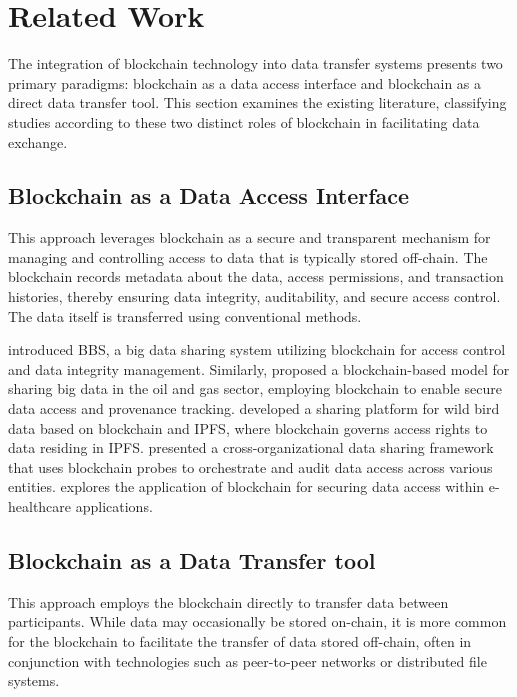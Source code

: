 \documentclass[10pt]{llncs}
\begin{document}
\section{Related Work} \label{related_work}

The integration of blockchain technology into data transfer systems presents two primary paradigms: blockchain as a data access interface and blockchain as a direct data transfer tool. 
This section examines the existing literature, classifying studies according to these two distinct roles of blockchain in facilitating data exchange.

\subsection{Blockchain as a Data Access Interface}

This approach leverages blockchain as a secure and transparent mechanism for managing and controlling access to data that is typically stored off-chain. 
The blockchain records metadata about the data, access permissions, and transaction histories, thereby ensuring data integrity, auditability, and secure access control.
The data itself is transferred using conventional methods.

\cite{Wang2024} introduced BBS, a big data sharing system utilizing blockchain for access control and data integrity management. 
Similarly, \cite{WangYY2021} proposed a blockchain-based model for sharing big data in the oil and gas sector, employing blockchain to enable secure data access and provenance tracking. 
\cite{Yang2022} developed a sharing platform for wild bird data based on blockchain and IPFS, where blockchain governs access rights to data residing in IPFS. 
\cite{Jia2023} presented a cross-organizational data sharing framework that uses blockchain probes to orchestrate and audit data access across various entities. 
\cite{Gupta2022} explores the application of blockchain for securing data access within e-healthcare applications.

\subsection{Blockchain as a Data Transfer tool}

This approach employs the blockchain directly to transfer data between participants. While data may occasionally be stored on-chain, it is more common for the blockchain to facilitate the transfer of data stored off-chain, often in conjunction with technologies such as peer-to-peer networks or distributed file systems.
\end{document}
